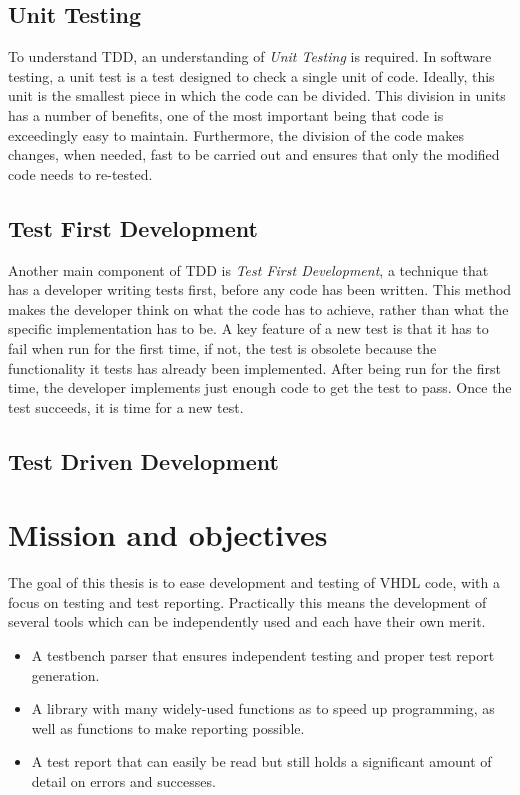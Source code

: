 \documentclass[11pt,british]{article}
\begin{document}
\subsection{Unit Testing}
To understand TDD, an understanding of \emph{Unit Testing} is required. In software testing, a unit test is a test designed to check a single unit of code. Ideally, this unit is the smallest piece in which the code can be divided. This division in units has a number of benefits, one of the most important being that code is exceedingly easy to maintain. Furthermore, the division of the code makes changes, when needed, fast to be carried out and ensures that only the modified code needs to re-tested.

\subsection{Test First Development}
Another main component of TDD is \emph{Test First Development}, a technique that has a developer writing tests first, before any code has been written. This method makes the developer think on what the code has to achieve, rather than what the specific implementation has to be. A key feature of a new test is that it has to fail when run for the first time, if not, the test is obsolete because the functionality it tests has already been implemented. After being run for the first time, the developer implements just enough code to get the test to pass. Once the test succeeds, it is time for a new test.

\subsection{Test Driven Development}


\section{Mission and objectives}

The goal of this thesis is to ease development and testing of VHDL
code, with a focus on testing and test reporting. Practically this
means the development of several tools which can be independently
used and each have their own merit.
\begin{itemize}
\item A testbench parser that ensures independent testing and proper test
report generation.
\item A library with many widely-used functions as to speed up programming,
as well as functions to make reporting possible.
\item A test report that can easily be read but still holds a significant
amount of detail on errors and successes.\end{itemize}
\end{document}
